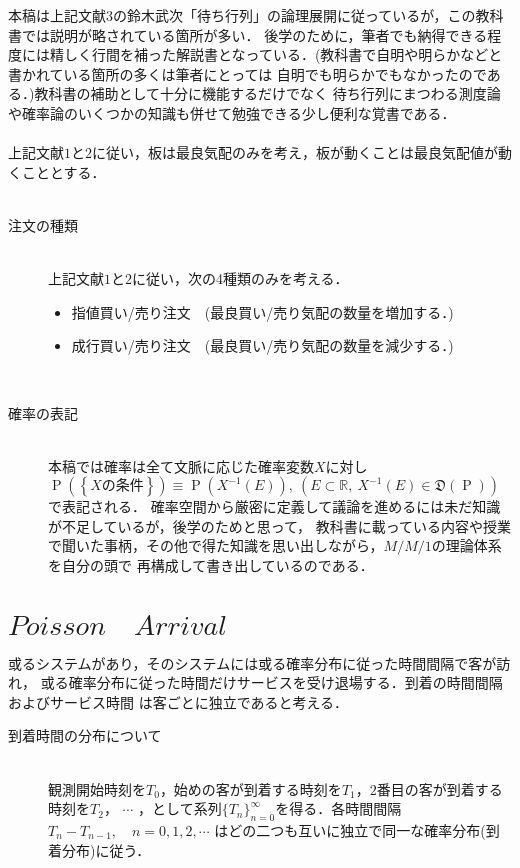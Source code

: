 \documentclass[a4j,papersize,disablejfam,slide,14pt]{jsarticle}
\def\prob#1{\operatorname{P} \left(\left\{ #1 \right\}\right)} %
\begin{document}
    本稿は上記文献$3$の鈴木武次「待ち行列」の論理展開に従っているが，この教科書では説明が略されている箇所が多い．
    後学のために，筆者でも納得できる程度には精しく行間を補った解説書となっている．(教科書で自明や明らかなどと書かれている箇所の多くは筆者にとっては
    自明でも明らかでもなかったのである．)教科書の補助として十分に機能するだけでなく
    待ち行列にまつわる測度論や確率論のいくつかの知識も併せて勉強できる少し便利な覚書である．\\
    \mbox{}\\
    上記文献$1$と$2$に従い，板は最良気配のみを考え，板が動くことは最良気配値が動くこととする．\\
    \mbox{}\\
    \begin{description}
    	\item[注文の種類]\mbox{}\\
     	上記文献$1$と$2$に従い，次の4種類のみを考える．
    	\begin{itemize}
    		\item 指値買い/売り注文　(最良買い/売り気配の数量を増加する．)
        	\item 成行買い/売り注文　(最良買い/売り気配の数量を減少する．)
    	\end{itemize}
        \mbox{}\\
        \item[確率の表記]\mbox{}\\
        	本稿では確率は全て文脈に応じた確率変数$X$に対し$\prob{\mbox{$X$の条件}} \equiv \operatorname{P}(X^{-1}(E)),
            \ (E \subset \mathbb{R},\ X^{-1}(E) \in \mathfrak{D}(\operatorname{P}))$で表記される．
            確率空間から厳密に定義して議論を進めるには未だ知識が不足しているが，後学のためと思って，
            教科書に載っている内容や授業で聞いた事柄，その他で得た知識を思い出しながら，$M/M/1$の理論体系を自分の頭で
            再構成して書き出しているのである．
     \end{description}

\section{$Poisson\quad Arrival$}
    \begin{screen}
    或るシステムがあり，そのシステムには或る確率分布に従った時間間隔で客が訪れ，
    或る確率分布に従った時間だけサービスを受け退場する．到着の時間間隔およびサービス時間
    は客ごとに独立であると考える．
    \end{screen}
    \begin{description}
    	\item[到着時間の分布について]\mbox{}\\
    	観測開始時刻を$T_0$，始めの客が到着する時刻を$T_1$，$2$番目の客が到着する時刻を$T_2$，
    	$\cdots$ ，として系列$\{T_n\}_{n=0}^{\infty}$を得る．各時間間隔$T_n - T_{n-1},\quad n=0,1,2,\cdots$
    	はどの二つも互いに独立で同一な確率分布(到着分布)に従う．
    \end{description}
\end{document}
